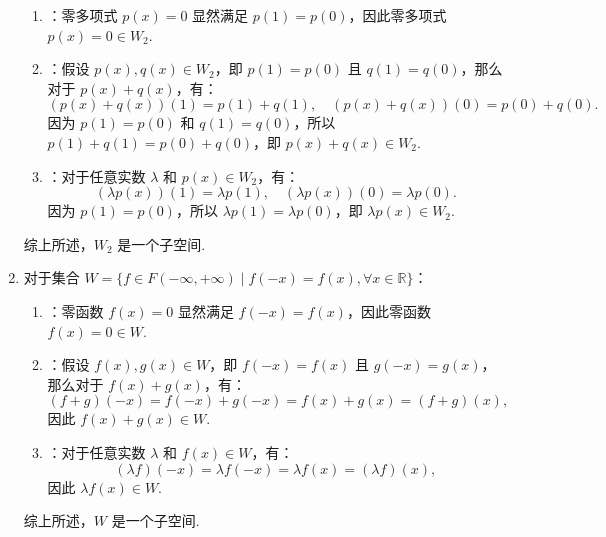 \begin{exercise}
\begin{exgroup}
\begin{answer}
\begin{enumerate}
                \begin{enumerate}
                    \item {}：零多项式 $p(x) = 0$ 显然满足 $p(1) = p(0)$，因此零多项式 $p(x) = 0 \in W_2$.
                    \item {}：假设 $p(x), q(x) \in W_2$，即 $p(1) = p(0)$ 且 $q(1) = q(0)$，那么对于 $p(x) + q(x)$，有：
                    \[
                    (p(x) + q(x))(1) = p(1) + q(1), \quad (p(x) + q(x))(0) = p(0) + q(0).
                    \]
                    因为 $p(1) = p(0)$ 和 $q(1) = q(0)$，所以 $p(1) + q(1) = p(0) + q(0)$，即 $p(x) + q(x) \in W_2$.
                    \item {}：对于任意实数 $\lambda$ 和 $p(x) \in W_2$，有：
                    \[
                    (\lambda p(x))(1) = \lambda p(1), \quad (\lambda p(x))(0) = \lambda p(0).
                    \]
                    因为 $p(1) = p(0)$，所以 $\lambda p(1) = \lambda p(0)$，即 $\lambda p(x) \in W_2$.
                \end{enumerate}
                综上所述，$W_2$ 是一个子空间.

                \item 对于集合 $W = \{f \in F(-\infty, +\infty) \mid f(-x) = f(x), \forall x \in \mathbb{R}\}$：

                \begin{enumerate}
                    \item {}：零函数 $f(x) = 0$ 显然满足 $f(-x) = f(x)$，因此零函数 $f(x) = 0 \in W$.
                    \item {}：假设 $f(x), g(x) \in W$，即 $f(-x) = f(x)$ 且 $g(-x) = g(x)$，那么对于 $f(x) + g(x)$，有：
                    \[
                    (f + g)(-x) = f(-x) + g(-x) = f(x) + g(x) = (f + g)(x),
                    \]
                    因此 $f(x) + g(x) \in W$.
                    \item {}：对于任意实数 $\lambda$ 和 $f(x) \in W$，有：
                    \[
                    (\lambda f)(-x) = \lambda f(-x) = \lambda f(x) = (\lambda f)(x),
                    \]
                    因此 $\lambda f(x) \in W$.
                \end{enumerate}
                综上所述，$W$ 是一个子空间.

            \end{enumerate}
        \end{answer}
    \end{exgroup}


\end{exercise}

